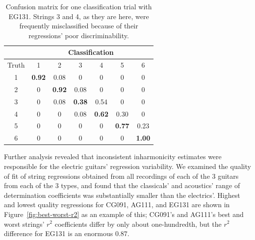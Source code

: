 \documentclass[12pt]{cmuthesis}
\begin{document}
\begin{table}
\begin{center}
\begin{tabular}{|c||c|c|c|c|c|c|}
\hline
& \multicolumn{6}{|c|}{Classification} \\
\hline
Truth &1	&2	&3	&4	&5	&6\\
\hline
\hline
1	&\bf{0.92}	& 0.08	& 0	& 0	&0	& 0 \\ 
\hline
2	&0	& \bf{0.92}	& 0.08	& 0	&0	& 0 \\
\hline
3	&0	& 0.08	& \bf{0.38}	&0.54	& 0	& 0 \\ 
\hline
4	&0	& 0	& 0.08	&\bf{0.62}	& 0.30	& 0 \\
\hline
5	&0	& 0	& 0	&0	& \bf{0.77}	& 0.23\\ 
\hline
6	&0	& 0	& 0	&0	&0	& \bf{1.00} \\
\hline
\end{tabular}
\caption{Confusion matrix for one classification trial with EG131. Strings 3 and 4, as they are here, were frequently misclassified because of their regressions' poor discriminability.} 
\label{tab:cf-eg}
\end{center}
\end{table}

Further analysis revealed that inconsistent inharmonicity estimates were responsible for the electric guitars' regression variability. We examined the quality of fit of string regressions obtained from all recordings of each of the 3 guitars from each of the 3 types, and found that the classicals' and acoustics' range of determination coefficients was substantially smaller than the electrics'. Highest and lowest quality regressions for CG091, AG111, and EG131 are shown in Figure~\ref{fig:best-worst-r2} as an example of this; CG091's and AG111's best and worst strings' $r^2$ coefficients differ by only about one-hundredth, but the $r^2$ difference for EG131 is an enormous $0.87$.
\end{document}
